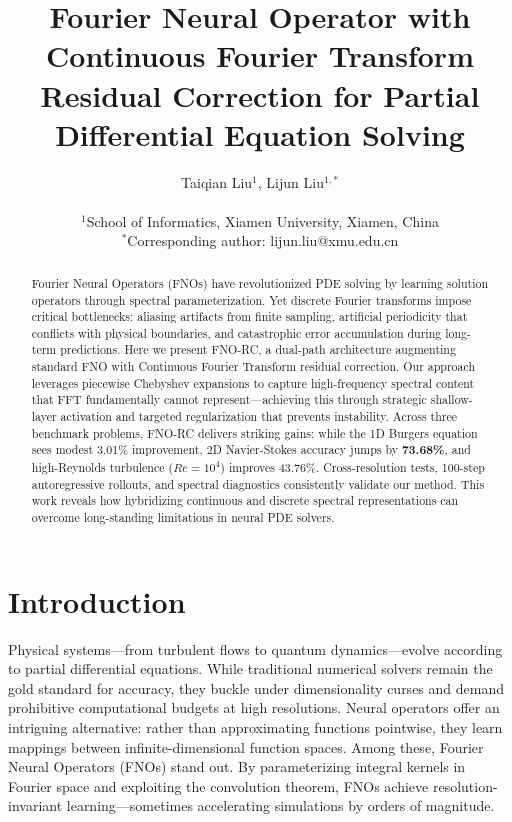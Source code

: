 \documentclass[11pt]{article}
\title{\textbf{Fourier Neural Operator with Continuous Fourier Transform Residual Correction for Partial Differential Equation Solving}}
\author{
    Taiqian Liu$^{1}$, Lijun Liu$^{1,*}$ \\
    \\
    $^{1}$School of Informatics, Xiamen University, Xiamen, China \\
    $^{*}$Corresponding author: lijun.liu@xmu.edu.cn
}
\date{}
\begin{document}
\maketitle

\begin{abstract}
Fourier Neural Operators (FNOs) have revolutionized PDE solving by learning solution operators through spectral parameterization. Yet discrete Fourier transforms impose critical bottlenecks: aliasing artifacts from finite sampling, artificial periodicity that conflicts with physical boundaries, and catastrophic error accumulation during long-term predictions. Here we present FNO-RC, a dual-path architecture augmenting standard FNO with Continuous Fourier Transform residual correction. Our approach leverages piecewise Chebyshev expansions to capture high-frequency spectral content that FFT fundamentally cannot represent—achieving this through strategic shallow-layer activation and targeted regularization that prevents instability. Across three benchmark problems, FNO-RC delivers striking gains: while the 1D Burgers equation sees modest 3.01\% improvement, 2D Navier-Stokes accuracy jumps by \textbf{73.68\%}, and high-Reynolds turbulence ($Re=10^4$) improves 43.76\%. Cross-resolution tests, 100-step autoregressive rollouts, and spectral diagnostics consistently validate our method. This work reveals how hybridizing continuous and discrete spectral representations can overcome long-standing limitations in neural PDE solvers.
\end{abstract}

\section{Introduction}

Physical systems—from turbulent flows to quantum dynamics—evolve according to partial differential equations. While traditional numerical solvers remain the gold standard for accuracy, they buckle under dimensionality curses and demand prohibitive computational budgets at high resolutions. Neural operators \citep{kovachki2021neural,lu2021learning} offer an intriguing alternative: rather than approximating functions pointwise, they learn mappings between infinite-dimensional function spaces. Among these, Fourier Neural Operators (FNOs) \citep{Li2020FNO} stand out. By parameterizing integral kernels in Fourier space and exploiting the convolution theorem, FNOs achieve resolution-invariant learning—sometimes accelerating simulations by orders of magnitude.
\end{document}
